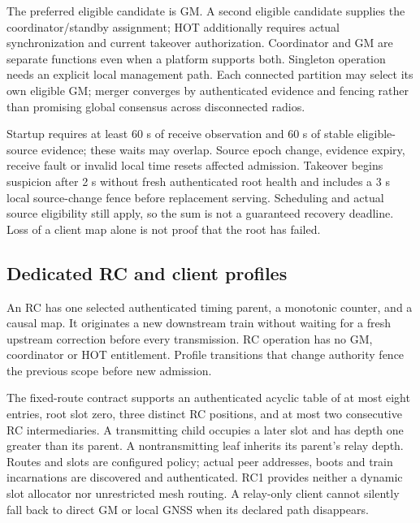 \documentclass[11pt,letterpaper]{article}
\begin{document}
The preferred eligible candidate is GM. A second eligible candidate supplies the coordinator/standby assignment; HOT additionally requires actual synchronization and current takeover authorization. Coordinator and GM are separate functions even when a platform supports both. Singleton operation needs an explicit local management path. Each connected partition may select its own eligible GM; merger converges by authenticated evidence and fencing rather than promising global consensus across disconnected radios.

Startup requires at least 60 s of receive observation and 60 s of stable eligible-source evidence; these waits may overlap. Source epoch change, evidence expiry, receive fault or invalid local time resets affected admission. Takeover begins suspicion after 2 s without fresh authenticated root health and includes a 3 s local source-change fence before replacement serving. Scheduling and actual source eligibility still apply, so the sum is not a guaranteed recovery deadline. Loss of a client map alone is not proof that the root has failed.

\subsection{Dedicated RC and client profiles}
An RC has one selected authenticated timing parent, a monotonic counter, and a causal map. It originates a new downstream train without waiting for a fresh upstream correction before every transmission. RC operation has no GM, coordinator or HOT entitlement. Profile transitions that change authority fence the previous scope before new admission.

The fixed-route contract supports an authenticated acyclic table of at most eight entries, root slot zero, three distinct RC positions, and at most two consecutive RC intermediaries. A transmitting child occupies a later slot and has depth one greater than its parent. A nontransmitting leaf inherits its parent's relay depth. Routes and slots are configured policy; actual peer addresses, boots and train incarnations are discovered and authenticated. RC1 provides neither a dynamic slot allocator nor unrestricted mesh routing. A relay-only client cannot silently fall back to direct GM or local GNSS when its declared path disappears.
\end{document}
